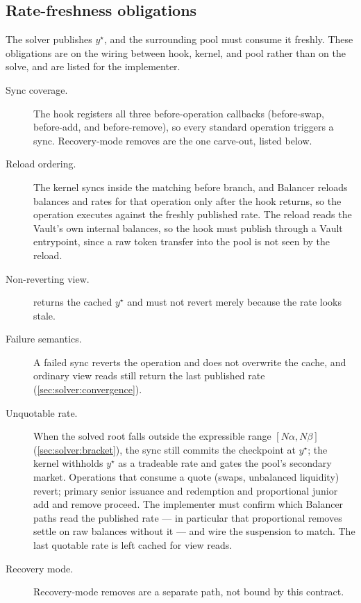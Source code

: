 \subsection{Rate-freshness obligations}
\label{sec:solver:freshness}

The solver publishes $y^\star$, and the surrounding pool must consume
it freshly. These obligations are on the wiring between hook, kernel,
and pool rather than on the solve, and are listed for the implementer.

\begin{description}
  \item[Sync coverage.] The hook registers all three before-operation
    callbacks (before-swap, before-add, and before-remove), so
    every standard operation triggers a sync. Recovery-mode removes are
    the one carve-out, listed below.
  \item[Reload ordering.] The kernel syncs inside the matching before
    branch, and Balancer reloads balances and rates for that operation only
    after the hook returns, so the operation executes against the freshly
    published rate. The reload reads the Vault's own internal balances, so
    the hook must publish through a Vault entrypoint, since a raw token
    transfer into the pool is not seen by the reload.
  \item[Non-reverting view.]  returns the cached $y^\star$
    and must not revert merely because the rate looks stale.
  \item[Failure semantics.] A failed sync reverts the operation and does
    not overwrite the cache, and ordinary view reads still return the
    last published rate (\cref{sec:solver:convergence}).
  \item[Unquotable rate.] When the solved root falls outside the
    expressible range $[N\alpha, N\beta]$ (\cref{sec:solver:bracket}), the
    sync still commits the checkpoint at $y^\star$; the kernel withholds
    $y^\star$ as a tradeable rate and gates the pool's secondary market.
    Operations that consume a quote (swaps, unbalanced liquidity) revert;
    primary senior issuance and redemption and proportional junior
    add and remove proceed. The implementer must confirm which Balancer
    paths read the published rate --- in particular that proportional
    removes settle on raw balances without it --- and wire the suspension
    to match. The last quotable rate is left cached for view reads.
  \item[Recovery mode.] Recovery-mode removes are a separate path, not
    bound by this contract.
\end{description}
